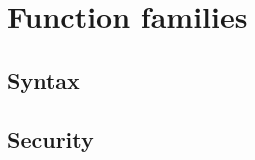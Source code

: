 \documentclass[../../main.tex]{subfiles}
\begin{document}
\onlyinsubfile
{
    
}

\section{Function families}\label{sec-ff}
    \subsection{Syntax}
        
    \subsection{Security}
        
        

\onlyinsubfile
{
    \begin{small}
        
        
    \end{small}
}
\end{document}
